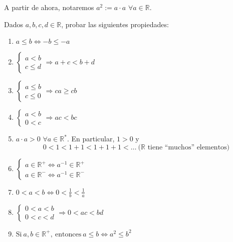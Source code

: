 \begin{notacion}
    A partir de ahora, notaremos $a^{2}:=a \cdot a$ $\forall a \in \mathbb{R}$.
\end{notacion}
\begin{ejercicio}
Dados $a,b,c,d \in \mathbb{R}$, probar las siguientes propiedades:
    \begin{enumerate}
        \item $a \leq b \Longleftrightarrow -b \leq -a$

        \item $\left\{ \begin{array}{lcc}
                a < b \\
                c \leq d
            \end{array}
        \right. \Longrightarrow a+c < b+d$

        \item $\left\{ \begin{array}{lcc}
                a \leq b \\
                c \leq 0
            \end{array}
        \right. \Longrightarrow ca \geq cb$

        \item $\left\{ \begin{array}{lcc}
                a < b \\
                0 < c
            \end{array}
        \right. \Longrightarrow ac < bc$

        \item $a \cdot a > 0$ $\forall a \in \mathbb{R}^{*}$. En particular, $1 > 0$ y
        \begin{equation*}
            0 < 1 < 1+1 < 1+1+1 < \dots ~\text{($\mathbb{R}$ tiene ``muchos'' elementos)}
        \end{equation*}
        
        \item $\left\{ \begin{array}{lcc}
            a \in \mathbb{R}^{+} \Longleftrightarrow  a^{-1} \in \mathbb{R}^{+} \\
            a \in \mathbb{R}^{-} \Longleftrightarrow  a^{-1} \in \mathbb{R}^{-}
        \end{array}
        \right.$
        
        \item $0 < a < b \Longleftrightarrow 0 < \frac{1}{b} < \frac{1}{a}$
        
        \item $\left\{ \begin{array}{lcc}
                0 < a < b \\
                0 < c < d
            \end{array}
        \right. \Longrightarrow 0 < ac < bd$
        
        \item $\text{Si}~ a,b \in \mathbb{R}^{+}, ~ \text{entonces} ~ a \leq b \Longleftrightarrow a^{2} \leq b^{2}$
    \end{enumerate}

    \vspace{0.5cm}
\end{ejercicio}
